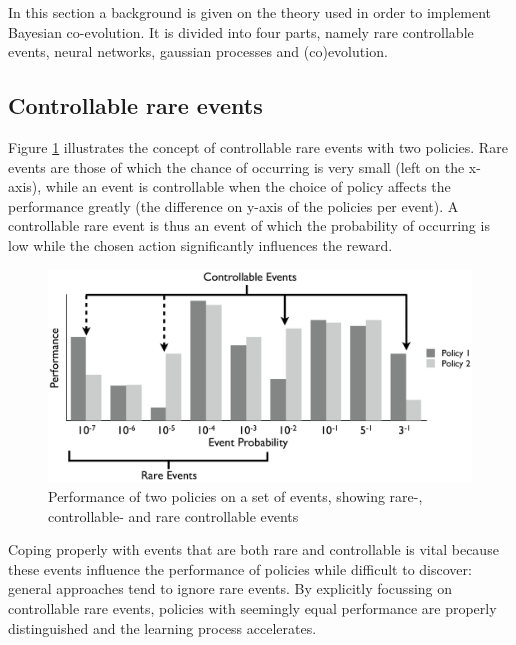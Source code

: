 In this section a background is given on the theory used in order to implement Bayesian co-evolution. It is divided into four parts, namely rare controllable events, neural networks, gaussian processes and (co)evolution. 

\subsection{Controllable rare events}
Figure \ref{rareControllableImage} illustrates the concept of controllable rare events with two policies. Rare events are those of which the chance of occurring is very small (left on the x-axis), while an event is controllable when the choice of policy affects the performance greatly (the difference on y-axis of the policies per event). A controllable rare event is thus an event of which the probability of occurring is low while the chosen action significantly influences the reward.

\begin{figure}[ht]
  \centering
  \includegraphics{images/rare-controllable.png}
  \caption{Performance of two policies on a set of events, showing rare-, controllable- and rare controllable events}\label{rareControllableImage}
\end{figure}

Coping properly with events that are both rare and controllable is vital because these events influence the performance of policies while difficult to discover: general approaches tend to ignore rare events. By explicitly focussing on controllable rare events, policies with seemingly equal performance are properly distinguished and the learning process accelerates.

